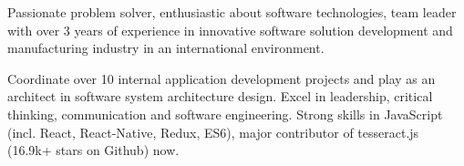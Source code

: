 

\begin{cvparagraph}

Passionate problem solver, enthusiastic about software technologies, team leader with over 3 years of experience in innovative software solution development and manufacturing industry in an international environment.

Coordinate over 10 internal application development projects and play as an architect in software system architecture design. Excel in leadership, critical thinking, communication and software engineering. Strong skills in JavaScript (incl. React, React-Native, Redux, ES6), major contributor of tesseract.js (16.9k+ stars on Github) now.
\end{cvparagraph}

